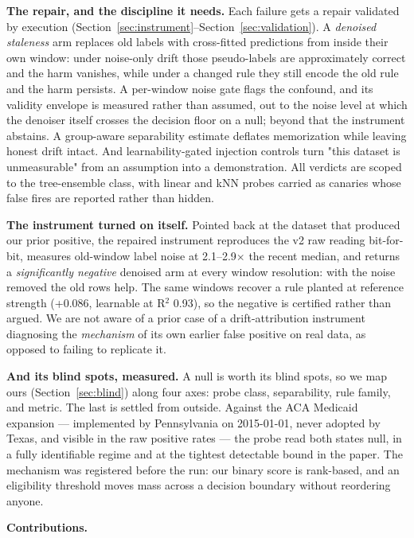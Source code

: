 \documentclass[10pt]{article} %
\begin{document}
\textbf{The repair, and the discipline it needs.} Each failure gets a repair validated by execution
(Section~\ref{sec:instrument}--Section~\ref{sec:validation}). A \emph{denoised staleness} arm replaces old labels with cross-fitted predictions from inside
their own window: under noise-only drift those pseudo-labels are approximately correct and the harm
vanishes, while under a changed rule they still encode the old rule and the harm persists. A
per-window noise gate flags the confound, and its validity envelope is measured rather than assumed,
out to the noise level at which the denoiser itself crosses the decision floor on a null; beyond
that the instrument abstains. A group-aware separability estimate deflates memorization while
leaving honest drift intact. And learnability-gated injection controls turn "this dataset is
unmeasurable" from an assumption into a demonstration. All verdicts are scoped to the tree-ensemble class, with linear and kNN
probes carried as canaries whose false fires are reported rather than hidden.

\textbf{The instrument turned on itself.} Pointed back at the dataset that produced our prior positive,
the repaired instrument reproduces the v2 raw reading bit-for-bit, measures old-window label noise
at 2.1--2.9$\times$ the recent median, and returns a \emph{significantly negative} denoised arm at every window
resolution: with the noise removed the old rows help. The same windows recover a rule planted at
reference strength (+0.086, learnable at R$^2$ 0.93), so the negative is certified rather than
argued. We are not aware of a prior case of a drift-attribution instrument diagnosing the
\emph{mechanism} of its own earlier false positive on real data, as opposed to failing to replicate it.

\textbf{And its blind spots, measured.} A null is worth its blind spots, so we map ours
(Section~\ref{sec:blind}) along four axes: probe class, separability, rule family, and metric. The
last is settled from outside. Against the ACA Medicaid expansion --- implemented by Pennsylvania on
2015-01-01, never adopted by Texas, and visible in the raw positive rates --- the probe read both
states null, in a fully identifiable regime and at the tightest detectable bound in the paper. The
mechanism was registered before the run: our binary score is rank-based, and an eligibility
threshold moves mass across a decision boundary without reordering anyone.

\textbf{Contributions.}
\end{document}
